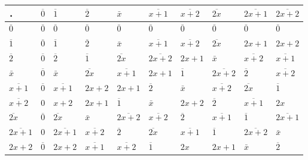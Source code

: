 \documentclass[UTF8, heading=true]{ctexart}
\begin{document}
\begin{tabular}{l||l|l|l|l|l|l|l|l|l}
  
 \hline． & $\overline{0}$ & $\overline{1}$ & $\overline{2}$ & $\bar{x}$ & $\overline{x+1}$ & $\overline{x+2}$ & $\overline{2 x}$ & $\overline{2 x+1}$ & $\overline{2 x+2}$ \\
 \hline $\overline{0}$ & $\overline{0}$ & $\overline{0}$ & $\overline{0}$ & $\overline{0}$ & $\overline{0}$ & $\overline{0}$ & $\overline{0}$ & $\overline{0}$ & $\overline{0}$ \\
 $\overline{1}$ & $\overline{0}$ & $\overline{1}$ & $\overline{2}$ & $\bar{x}$ & $\overline{x+1}$ & $\overline{x+2}$ & $\overline{2 x}$ & $2 x+1$ & $2 x+2$ \\
 $\overline{2}$ & $\overline{0}$ & $\overline{2}$ & $\overline{1}$ & $\overline{2 x}$ & $\overline{2 x+2}$ & $2 x+1$ & $\bar{x}$ & $\overline{x+2}$ & $\overline{x+1}$ \\
 $\bar{x}$ & $\overline{0}$ & $\bar{x}$ & $\overline{2 x}$ & $\overline{x+1}$ & $2 x+1$ & $\overline{1}$ & $\overline{2 x+2}$ & $\overline{2}$ & $\overline{x+2}$ \\
 $\overline{x+1}$ & $\overline{0}$ & $\overline{x+1}$ & $2 x+2$ & $2 x+1$ & $\overline{2}$ & $\bar{x}$ & $\overline{x+2}$ & $\overline{2 x}$ & $\overline{1}$ \\
 $\overline{x+2}$ & 0 & $x+2$ & $2 x+1$ & $\overline{1}$ & $\bar{x}$ & $2 x+2$ & $\overline{2}$ & $\overline{x+1}$ & $2 x$ \\
 $\overline{2 x}$ & $\overline{0}$ & $\overline{2 x}$ & $\bar{x}$ & $\overline{2 x+2}$ & $\overline{x+2}$ & $\overline{2}$ & $\overline{x+1}$ & $\overline{1}$ & $\overline{2 x+1}$ \\
 $\overline{2 x+1}$ & 0 & $\overline{2 x+1}$ & $\overline{x+2}$ & $\overline{2}$ & $\overline{2 x}$ & $\overline{x+1}$ & $\overline{1}$ & $\overline{2 x+2}$ & $\bar{x}$ \\
 $2 x+2$ & $\overline{0}$ & $2 x+2$ & $\overline{x+1}$ & $\overline{x+2}$ & $\overline{1}$ & $2 x$ & $2 x+1$ & $\bar{x}$ & $\overline{2}$ \\
\hline
\end{tabular}
\vspace{0.5cm}
\end{document}

